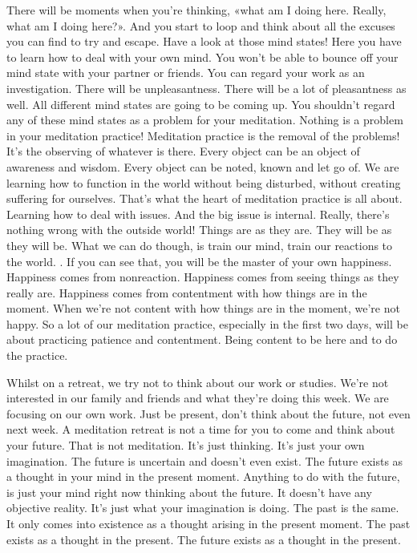 \documentclass[letterpaper,10pt,english]{sphinxmanual}
\begin{document}
\sphinxAtStartPar
There will be moments when you’re thinking, «what am I doing here.
Really, what am I doing here?». And you start to loop and think about all
the excuses you can find to try and escape. Have a look at those mind states!
Here you have to learn how to deal with your own mind. You won’t be able to
bounce off your mind state with your partner or friends. You can regard your
work as an investigation. There will be unpleasantness. There will be a lot
of pleasantness as well. All different mind states are going to be coming up.
You shouldn’t regard any of these mind states as a problem for your meditation. Nothing is a problem in your meditation practice! Meditation practice
is the removal of the problems! It’s the observing of whatever is there. Every
object can be an object of awareness and wisdom. Every object can be noted,
known and let go of. We are learning how to function in the world without
being  disturbed,  without  creating  suffering  for  ourselves.  That’s  what  the
heart of meditation practice is all about. Learning how to deal with issues.
And the big issue is internal. Really, there’s nothing wrong with the outside
world! Things are as they are. They will be as they will be. What we can do
though, is train our mind, train our reactions to the world.
. If you can see
that, you will be the master of your own happiness. Happiness comes from
   non\sphinxhyphen{}reaction. Happiness comes from seeing things as they really are. Happiness comes from contentment with how things are in the moment. When
we’re not content with how things are in the moment, we’re not happy. So a
lot of our meditation practice, especially in the first two days, will be about
practicing patience and contentment. Being content to be here and to do the
practice.

\sphinxAtStartPar
Whilst on a retreat, we try not to think about our work or studies. We’re
not interested in our family and friends and what they’re doing this week. We
are focusing on our own work. Just be present, don’t think about the future,
not even next week. A meditation retreat is not a time for you to come and
think  about  your  future.  That  is  not  meditation.  It’s  just  thinking.  It’s  just
your own imagination. The future is uncertain and doesn’t even exist. The
future exists as a thought in your mind in the present moment. Anything to
do with the future, is just your mind right now thinking about the future. It
doesn’t have any objective reality. It’s just what your imagination is doing.
The past is the same. It only comes into existence as a thought arising in the
present moment. The past exists as a thought in the present. The future exists
as a thought in the present.
\end{document}
